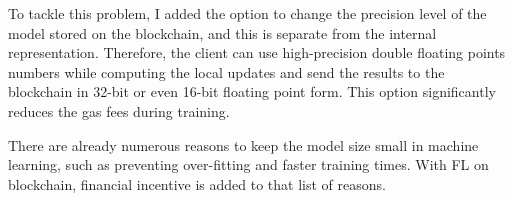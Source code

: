 To tackle this problem, I added the option to change the precision level of the model stored on the blockchain, and this is separate from the internal representation.
Therefore, the client can use high-precision double floating points numbers while computing the local updates and send the results to the blockchain in 32-bit or even 16-bit floating point form.
This option significantly reduces the gas fees during training.

There are already numerous reasons to keep the model size small in machine learning, such as preventing over-fitting and faster training times.
With FL on blockchain, financial incentive is added to that list of reasons.
